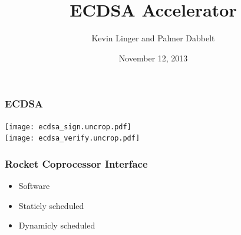 \documentclass{beamer}
\title{ECDSA Accelerator}
\author{Kevin Linger and Palmer Dabbelt}
\date{November 12, 2013}
\begin{document}
\maketitle

\begin{frame}
  \frametitle{ECDSA}

  \begin{center}
    \begin{multicols}{2}
      \texttt{[image: ecdsa\_sign.uncrop.pdf]} \\
      \texttt{[image: ecdsa\_verify.uncrop.pdf]} \\
    \end{multicols}
  \end{center}
\end{frame}

\begin{frame}
  \frametitle{Rocket Coprocessor Interface}

  \begin{multicols}{2}
    \begin{center}
      
    \end{center}

    \setcounter{beamerpauses}{3}
    \begin{itemize}
      \item<2-> Software
      \item<7-> Staticly scheduled
      \item<13-> Dynamicly scheduled
    \end{itemize}
  \end{multicols}
\end{frame}
\end{document}
